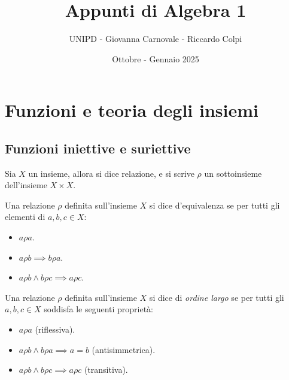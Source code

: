 \documentclass[11pt]{scrartcl}
\begin{document}
	\title{Appunti di Algebra 1}
	\subtitle{UNIPD - Giovanna Carnovale - Riccardo Colpi}
	\date{Ottobre - Gennaio 2025}
	
	
	\maketitle
	
	\tableofcontents
	
	\newpage
	
	\section{Funzioni e teoria degli insiemi}
	
	\subsection{Funzioni iniettive e suriettive}
	
	\begin{definition}[Relazione]
		Sia $X$ un insieme, allora si dice relazione, e si scrive $\rho$ un sottoinsieme dell'insieme $X\times X$.
	\end{definition}
	
	\begin{definition}
		Una relazione $\rho$ definita sull'insieme $X$ si dice d'equivalenza se per tutti gli elementi di $a,b,c\in X$:
		\begin{itemize}
			\item $a\rho a$.
			\item $a\rho b \implies b\rho a$.
			\item $a\rho b \land b\rho c \implies a\rho c$.
		\end{itemize}
	\end{definition}
	
	\begin{definition}
		Una relazione $\rho$ definita sull'insieme $X$ si dice di \textit{ordine largo} se per tutti gli $a,b,c\in X$ soddisfa le seguenti proprietà:
		\begin{itemize}
			\item $a\rho a$ (riflessiva).
			\item $a\rho b \land b\rho a \implies a=b$ (antisimmetrica).
			\item $a\rho b \land b\rho c \implies a\rho c$ (transitiva).
		\end{itemize} 
	\end{definition}
	
\end{document}
